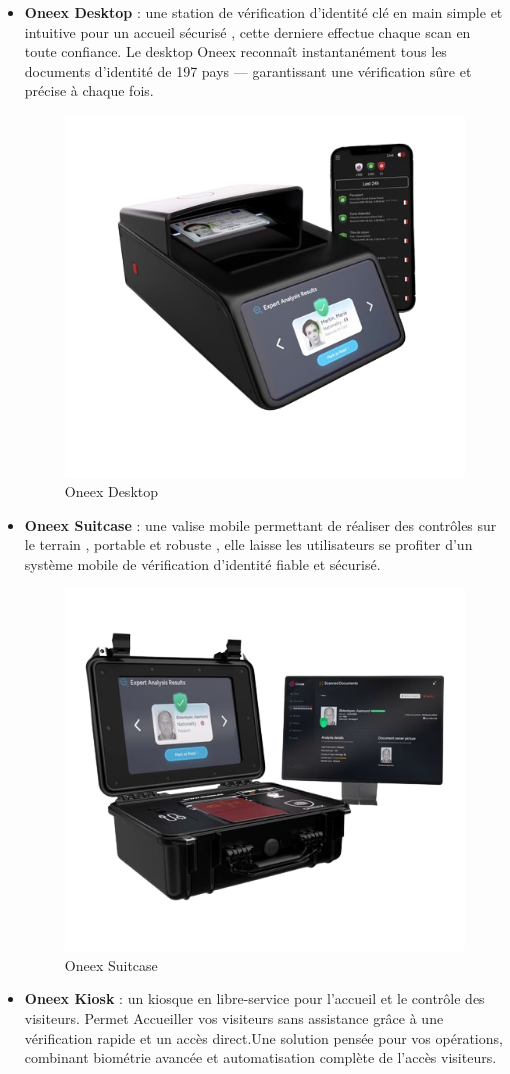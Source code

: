 \begin{itemize}
	\item \textbf{Oneex Desktop} : une station de vérification d’identité clé en main simple et intuitive pour un accueil sécurisé , cette derniere effectue chaque scan en toute confiance. Le desktop Oneex reconnaît instantanément tous les documents d'identité de 197 pays — garantissant une vérification sûre et précise à chaque fois.
	      \begin{figure} [H]
		      \centering
		      \includegraphics[width=.5\textwidth]{figures/Oneex desktop.png}
		      \caption{Oneex Desktop}
	      \end{figure}
	\item \textbf{Oneex Suitcase} : une valise mobile permettant de réaliser des contrôles sur le terrain , portable et robuste , elle laisse les utilisateurs se profiter d’un système mobile de vérification d’identité fiable et sécurisé.
	      \begin{figure} [H]
		      \centering
		      \includegraphics[width=.5\textwidth]{figures/Oneex suitcase.png}
		      \caption{Oneex Suitcase}
	      \end{figure}
	\item \textbf{Oneex Kiosk} : un kiosque en libre-service pour l’accueil et le contrôle des visiteurs. Permet Accueiller vos visiteurs sans assistance grâce à une vérification rapide et un accès direct.Une solution pensée pour vos opérations, combinant biométrie avancée et automatisation complète de l’accès visiteurs.

\end{itemize}
